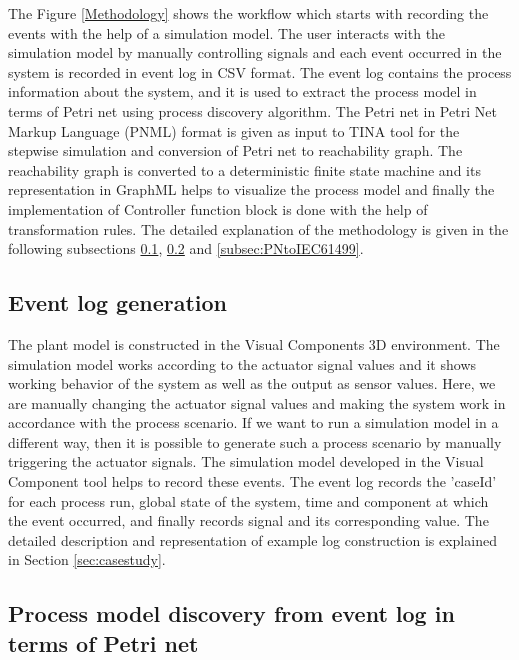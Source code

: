 \begin{bibunit}
The Figure \ref{Methodology} shows the workflow which starts with recording the events with the help of a simulation model. The user interacts with the simulation model by manually controlling signals and each event occurred in the system is recorded in event log in CSV format. The event log contains the process information about the system, and it is used to extract the process model in terms of Petri net \cite{petri1962} using process discovery algorithm. The Petri net in Petri Net Markup Language (PNML) format is given as input to TINA \cite{berthomieu2004tool} tool for the stepwise simulation and conversion of Petri net to reachability graph. The reachability graph is converted to a deterministic finite state machine and its representation in GraphML helps to visualize the process model and finally the implementation of Controller function block is done with the help of transformation rules. The detailed explanation of the methodology is given in the following subsections  \ref{subsec:eventlog_generation}, \ref{subsec:processdicovery} and \ref{subsec:PNtoIEC61499}.



\subsection{Event log generation}
\label{subsec:eventlog_generation}
The plant model is constructed in the Visual Components 3D environment.  The simulation model works according to the actuator signal values and it shows working behavior of the system as well as the output as sensor values. Here, we are manually changing the actuator signal values and making the system work in accordance with the process scenario. If we want to run a simulation model in a different way, then it is possible to generate such a process scenario by manually triggering the actuator signals. The simulation model developed in the Visual Component tool helps to record these events. The event log records the ’caseId’ for each process run, global state of the system, time and component at which the event occurred, and finally records signal and its corresponding value. The detailed description and representation of example log construction is explained in Section \ref{sec:casestudy}.






\subsection{Process model discovery from event log in terms of Petri net}
\label{subsec:processdicovery}


\end{bibunit}
